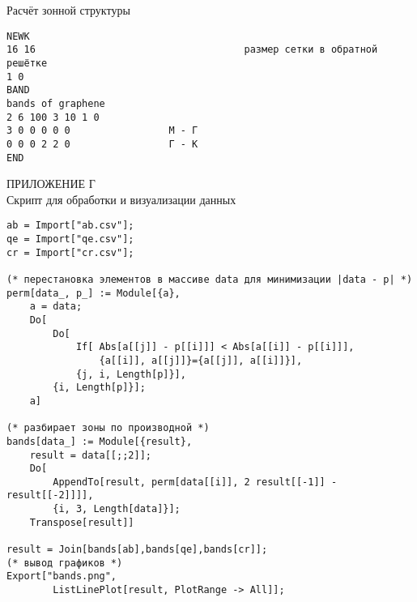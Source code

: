 \vspace{1cm}
Расчёт зонной структуры
\begin{Verbatim}[fontsize=\footnotesize]
NEWK
16 16                                    размер сетки в обратной решётке
1 0
BAND
bands of graphene
2 6 100 3 10 1 0
3 0 0 0 0 0                 M - Г
0 0 0 2 2 0                 Г - K
END
\end{Verbatim}
\newpage
\begin{center}
    ПРИЛОЖЕНИЕ Г\\
    Скрипт для обработки и визуализации данных
\end{center}
\begin{Verbatim}[fontsize=\footnotesize]
ab = Import["ab.csv"];
qe = Import["qe.csv"];
cr = Import["cr.csv"];

(* перестановка элементов в массиве data для минимизации |data - p| *)
perm[data_, p_] := Module[{a},
    a = data;
    Do[
        Do[
            If[ Abs[a[[j]] - p[[i]]] < Abs[a[[i]] - p[[i]]],
                {a[[i]], a[[j]]}={a[[j]], a[[i]]}],
            {j, i, Length[p]}],
        {i, Length[p]}];
    a]

(* разбирает зоны по производной *)
bands[data_] := Module[{result},
    result = data[[;;2]];
    Do[
        AppendTo[result, perm[data[[i]], 2 result[[-1]] - result[[-2]]]],
        {i, 3, Length[data]}];
    Transpose[result]]

result = Join[bands[ab],bands[qe],bands[cr]];
(* вывод графиков *)
Export["bands.png",
        ListLinePlot[result, PlotRange -> All]];
\end{Verbatim}